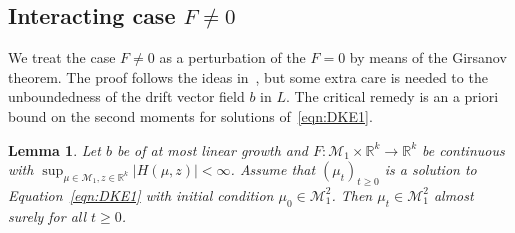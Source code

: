 \documentclass{article}
\newcommand{\R}{\mathbb{R}}
\newcommand{\F}{F}
\newcommand{\cM}{\mathcal M}
\newtheorem{lemma}[theorem]{Lemma}
\begin{document}
\subsection{Interacting case $\F\ne 0$}
\label{sec:pf_for_f_ne_zero}

We treat the case $\F\ne 0$ as a perturbation of the $\F=0$ by means of the Girsanov theorem.  The proof
follows the ideas in~\cite[Theorem 2]{Konarovskyi2020a}, but some extra care is needed to the unboundedness of
the drift vector field $b$ in $L$. The critical remedy is an a priori bound on the second moments for
solutions of~\eqref{eqn:DKE1}.




\begin{lemma}
  \label{lemma:secondmoment}
  Let $b$ be of at most linear growth and $\F\colon\mathcal M_1 \times \R^k \to \R^k$ be continuous with
  $\sup_{\mu \in \mathcal M_1, z \in \R^k} |H(\mu,z)| < \infty$.  Assume that $(\mu_t)_{t \geq 0}$ is a
  solution to Equation~\eqref{eqn:DKE1} with initial condition $\mu_0 \in \cM^2_1$. Then $\mu_t \in \cM^2_1$
  almost surely for all $t \geq 0$.
\end{lemma}
\end{document}
